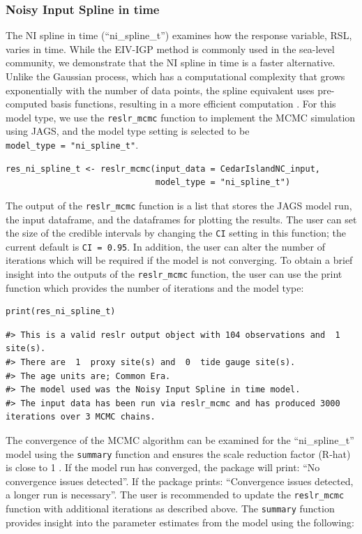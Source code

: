\subsubsection{Noisy Input Spline in time}\label{nisplinet}
The NI spline in time (``ni\_spline\_t'') examines how the response variable, RSL, varies in time. While the EIV-IGP method is commonly used in the sea-level community, we demonstrate that the NI spline in time is a faster alternative. Unlike the Gaussian process, which has a computational complexity that grows exponentially with the number of data points, the spline equivalent uses pre-computed basis functions, resulting in a more efficient computation \citep{wood_2017}.
For this model type, we use the \texttt{reslr\_mcmc} function to implement the MCMC simulation using JAGS, and the model type setting is selected to be \texttt{model\_type\ =\ "ni\_spline\_t"}.
\scriptsize
\begin{verbatim}
res_ni_spline_t <- reslr_mcmc(input_data = CedarIslandNC_input,
                              model_type = "ni_spline_t")
\end{verbatim}
\normalsize
The output of the \texttt{reslr\_mcmc} function is a list that stores the JAGS model run, the input dataframe, and the dataframes for plotting the results. The user can set the size of the credible intervals by changing the \texttt{CI} setting in this function; the current default is \texttt{CI\ =\ 0.95}. In addition, the user can alter the number of iterations which will be required if the model is not converging.
To obtain a brief insight into the outputs of the \texttt{reslr\_mcmc} function, the user can use the print function which provides the number of iterations and the model type:
\scriptsize
\begin{verbatim}
print(res_ni_spline_t)
\end{verbatim}
\begin{verbatim}
#> This is a valid reslr output object with 104 observations and  1 site(s).
#> There are  1  proxy site(s) and  0  tide gauge site(s).
#> The age units are; Common Era. 
#> The model used was the Noisy Input Spline in time model.
#> The input data has been run via reslr_mcmc and has produced 3000 iterations over 3 MCMC chains.
\end{verbatim}
\normalsize
The convergence of the MCMC algorithm can be examined for the ``ni\_spline\_t'' model using the \texttt{summary} function and ensures the scale reduction factor (R-hat) is close to 1 \citep{Gelman1992, gelman2013bayesian}. If the model run has converged, the package will print: ``No convergence issues detected''. If the package prints: ``Convergence issues detected, a longer run is necessary''. The user is recommended to update the \texttt{reslr\_mcmc} function with additional iterations as described above. The \texttt{summary} function provides insight into the parameter estimates from the model using the following:
